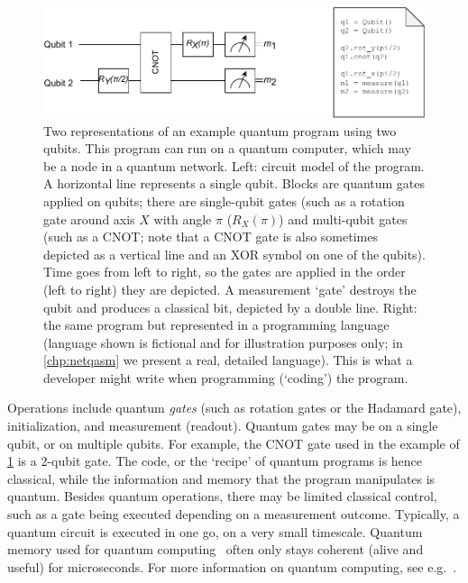 \begin{figure}[t]
    \centering
    \includegraphics[width=0.8\linewidth]{figures/background/local_circuit.pdf}
    \caption{
        Two representations of an example quantum program using two qubits.
        This program can run on a quantum computer, which may be a node in a quantum network.
        Left: circuit model of the program.
        A horizontal line represents a single qubit.
        Blocks are quantum gates applied on qubits; there are single-qubit gates (such as a rotation gate around axis $X$ with angle $\pi$ ($R_X(\pi)$) and multi-qubit gates (such as a CNOT; note that a CNOT gate is also sometimes depicted as a vertical line and an XOR symbol on one of the qubits).
        Time goes from left to right, so the gates are applied in the order (left to right) they are depicted.
        A measurement `gate' destroys the qubit and produces a classical bit, depicted by a double line.
        Right: the same program but represented in a programming language (language shown is fictional and for illustration purposes only; in \cref{chp:netqasm} we present a real, detailed language).
        This is what a developer might write when programming (`coding') the program.
    }
    \label{background:fig:local_circuit}
\end{figure}

Operations include quantum \emph{gates} (such as rotation gates or the Hadamard gate), initialization, and measurement (readout).
Quantum gates may be on a single qubit, or on multiple qubits.
For example, the CNOT gate used in the example of \cref{background:fig:local_circuit} is a 2-qubit gate.
The code, or the `recipe' of quantum programs is hence classical, while the information and memory that the program manipulates is quantum.
Besides quantum operations, there may be limited classical control, such as a gate being executed depending on a measurement outcome.
Typically, a quantum circuit is executed in one go, on a very small timescale.
Quantum memory used for quantum computing~\cite{de_leon_materials_2021} often only stays coherent (alive and useful) for microseconds.
For more information on quantum computing, see e.g.~\cite{nielsen_chuang_2002}.

